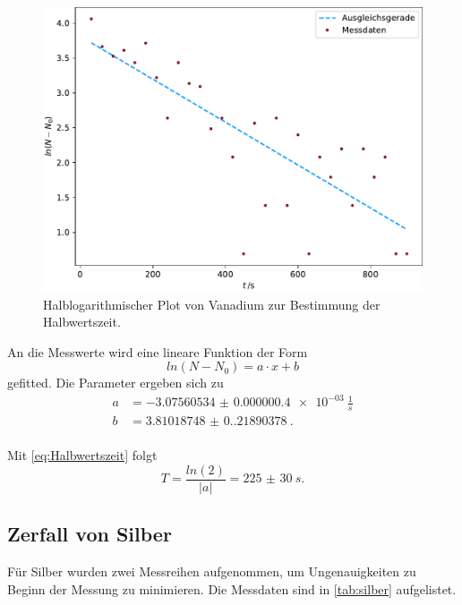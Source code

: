 \begin{figure}[H]
  \includegraphics[width=\linewidth]{plots/vanadium.pdf}
  \caption{Halblogarithmischer Plot von Vanadium zur Bestimmung der Halbwertszeit.}
  \label{fig:vanadium}
\end{figure}

An die Messwerte wird eine lineare Funktion der Form
\begin{equation*}
  ln(N-N_0) = a\cdot x + b
\end{equation*}
gefitted. Die Parameter ergeben sich zu 
\begin{align*}
  a &= \SI{-3.07560534(0.4)e-03}{\frac{1}{s}}\\
  b &= \SI{3.81018748(0.21890378)}{}.\\
\end{align*}

Mit \autoref{eq:Halbwertszeit} folgt 
\begin{equation*}
  T = \frac{ln(2)}{|a|} = \SI{225(30)}{s}.
\end{equation*}

\subsection{Zerfall von Silber}
Für Silber wurden zwei Messreihen aufgenommen, um Ungenauigkeiten zu Beginn der Messung
zu minimieren. Die Messdaten sind in \autoref{tab:silber} aufgelistet.

